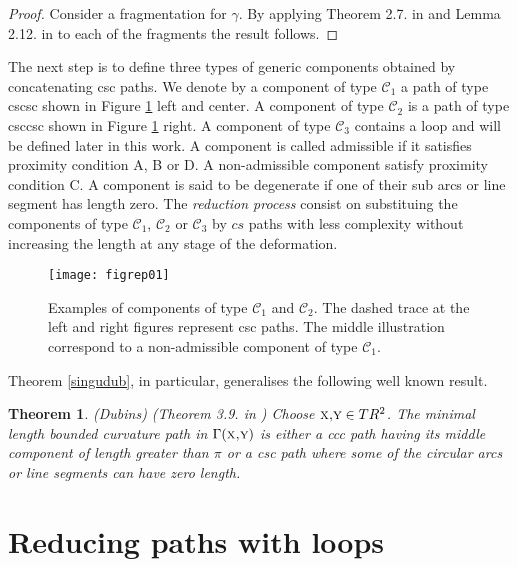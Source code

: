 \documentclass{amsart}
\newtheorem{theorem}{Theorem}[section]
\theoremstyle{definition}
\theoremstyle{remark}
\numberwithin{equation}{section}
\begin{document}
\begin{proof} Consider a fragmentation for $\gamma$. By applying Theorem 2.7. in \cite{paperd} and Lemma 2.12. in \cite{papera} to each of the fragments the result follows.
\end{proof}
 
The next step is to define three types of generic components obtained by concatenating {\sc csc} paths. We denote by a component of type ${\mathscr C}_1$ a path of type {\sc cscsc} shown in Figure \ref{figrep1} left and center. A component of type ${\mathscr C}_2$ is a path of type {\sc csccsc} shown in Figure \ref{figrep1} right. A component of type ${\mathscr C}_3$ contains a loop and will be defined later in this work. A component is called admissible if it satisfies proximity condition {\sc A}, {\sc B} or {\sc D}. A non-admissible component satisfy proximity condition {\sc C}. A component is said to be degenerate if one of their sub arcs or line segment has length zero. The {\it reduction process} consist on substituing the components of type ${\mathscr C}_1$, ${\mathscr C}_2$ or ${\mathscr C}_3$ by $cs$ paths with less complexity without increasing the length at any stage of the deformation.
  

{ \begin{figure} [[htbp]
 \begin{center}
\texttt{[image: figrep01]}
\end{center}
\caption{Examples of components of type ${\mathscr C}_1$ and ${\mathscr C}_2$. The dashed trace at the left and right figures represent {\sc csc} paths. The middle illustration correspond to a non-admissible component of type ${\mathscr C}_1$.}
 \label{figrep1}
\end{figure}}

Theorem \ref{singudub}, in particular, generalises the following well known result. 

\begin{theorem} \label{embdub} (Dubins) (Theorem 3.9. in  \cite{papera}) Choose $\mbox{\sc x,y} \in T{ R}^2$. The minimal length bounded curvature path in $\Gamma(\mbox{\sc x,y})$ is either a {\sc ccc} path having its middle component of length greater than $\pi $ or a {\sc csc} path where some of the circular arcs or line segments can have zero length.
\end{theorem}

 \section{Reducing paths with loops} \label{windingnumberofpaths}
\end{document}
